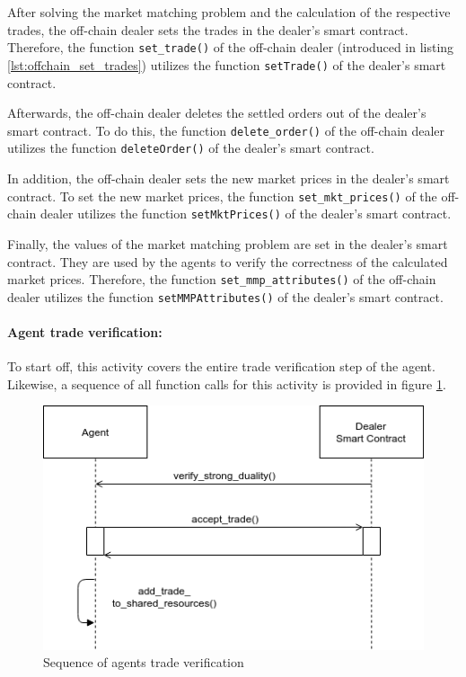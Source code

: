 After solving the market matching problem and the calculation of the respective 
trades, the off-chain dealer sets the trades in the dealer's smart contract.
Therefore, the function \verb|set_trade()| of the off-chain dealer (introduced in listing \ref{lst:offchain_set_trades})
utilizes the function \verb|setTrade()| of the dealer's smart contract.

Afterwards, the off-chain dealer deletes the settled orders out of the dealer's
smart contract. 
To do this, the function \verb|delete_order()| of the off-chain dealer
utilizes the function \verb|deleteOrder()| of the dealer's smart contract.

In addition, the off-chain dealer sets the new market prices in the dealer's smart contract.
To set the new market prices, the function \verb|set_mkt_prices()| of the off-chain dealer 
utilizes the function \verb|setMktPrices()| of the dealer's smart contract.

Finally, the values of the market matching problem are set in the dealer's smart contract. 
They are used by the agents to verify the correctness of the calculated market prices.
Therefore, the function \verb|set_mmp_attributes()| of the off-chain dealer
utilizes the function \verb|setMMPAttributes()| of the dealer's smart contract.

\paragraph{Agent trade verification:}
To start off, this activity covers the entire trade verification step of the agent. 
Likewise, a sequence of all function 
calls for this activity is provided in figure \ref{figure:agents_trade_verification}.

\begin{figure}[htbp]
	\centering
	\includegraphics[width=.8\linewidth]{./figures/trade_verification.png}
	\caption{Sequence of agents trade verification}
	\label{figure:agents_trade_verification}
\end{figure}


